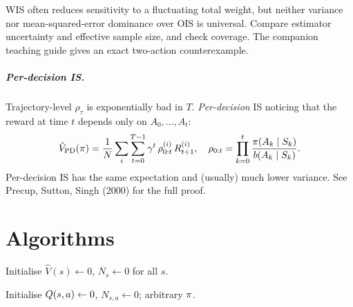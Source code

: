 \documentclass[11pt,oneside]{scrbook}
\begin{document}
\begin{remark}
WIS often reduces sensitivity to a fluctuating total weight, but neither
variance nor mean-squared-error dominance over OIS is universal. Compare
estimator uncertainty and effective sample size, and check coverage.
The companion teaching guide gives an exact two-action counterexample.
\end{remark}

\paragraph{Per-decision IS.}
Trajectory-level $\rho_\tau$ is exponentially bad in $T$. \emph{Per-decision}
IS noticing that the reward at time $t$ depends only on $A_0,\dots,A_t$:
\[
\hat V_{\mathrm{PD}}(\pi) = \frac{1}{N}\sum_i \sum_{t=0}^{T-1}
   \gamma^t \, \rho^{(i)}_{0:t} \, R^{(i)}_{t+1},
\quad
\rho_{0:t} = \prod_{k=0}^{t}\frac{\pi(A_k\mid S_k)}{b(A_k\mid S_k)}.
\]
Per-decision IS has the same expectation and (usually) much lower variance.
See Precup, Sutton, Singh (2000) for the full proof.

\chapter{Algorithms}

\begin{algorithm}[H]
\SetAlgoLined
{}
Initialise $\hat V(s) \gets 0$, $N_s\gets 0$ for all $s$.\;
\caption{First-visit MC policy evaluation.}
\end{algorithm}

\begin{algorithm}[H]
\SetAlgoLined
{}
Initialise $Q(s,a)\gets 0$, $N_{s,a}\gets 0$; arbitrary $\pi$.\;
\caption{On-policy every-visit MC control with $\epsilon$-soft policies.}
\end{algorithm}
\end{document}

